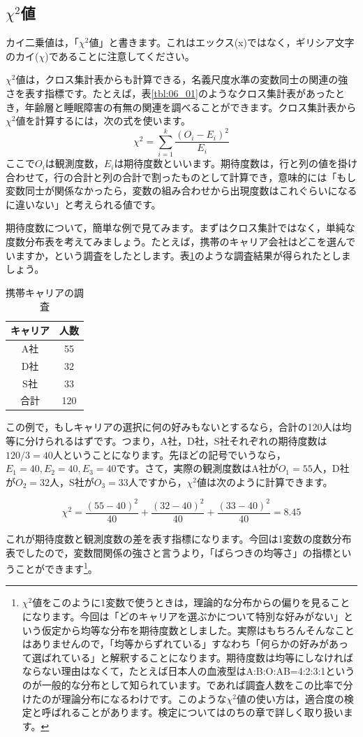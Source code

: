 \documentclass{ltjsbook}
\begin{document}
\subsection{$\chi^2$値}
\label{sec:chi_square}
カイ二乗値は，「$\chi^2$値」と書きます。これはエックス(x)ではなく，ギリシア文字のカイ($\chi$)であることに注意してください。

$\chi^2$値は，クロス集計表からも計算できる，名義尺度水準の変数同士の関連の強さを表す指標です。たとえば，表\ref{tbl:06_01}のようなクロス集計表があったとき，年齢層と睡眠障害の有無の関連を調べることができます。クロス集計表から$\chi^2$値を計算するには，次の式を使います。
\[
    \chi^2  = \sum_{i=1}^k \frac{(O_i - E_i)^2}{E_i} 
\]
ここで$O_i$は観測度数，$E_i$は期待度数といいます。期待度数は，行と列の値を掛け合わせて，行の合計と列の合計で割ったものとして計算でき，意味的には「もし変数同士が関係なかったら，変数の組み合わせから出現度数はこれぐらいになるに違いない」と考えられる値です。

期待度数について，簡単な例で見てみます。まずはクロス集計ではなく，単純な度数分布表を考えてみましょう。たとえば，携帯のキャリア会社はどこを選んでいますか，という調査をしたとします。表\ref{tbl:06_06}のような調査結果が得られたとしましょう。
\begin{table}[ht]
  \centering
  \caption{携帯キャリアの調査}
  \begin{tabular}{cc}
    キャリア & 人数 \\\hline
    A社      & 55  \\
    D社      & 32  \\
    S社      & 33    \\\hline
    合計      &  120 \\
  \end{tabular}
  \label{tbl:06_06}
\end{table}

この例で，もしキャリアの選択に何の好みもないとするなら，合計の120人は均等に分けられるはずです。つまり，A社，D社，S社それぞれの期待度数は$120/3=40$人ということになります。先ほどの記号でいうなら，$E_1=40, E_2=40, E_3=40$です。さて，実際の観測度数はA社が$O_1=55$人，D社が$O_2=32$人，S社が$O_3=33$人ですから，$\chi^2$値は次のように計算できます。

\[
    \chi^2 = \frac{(55 - 40)^2}{40} + \frac{(32 - 40)^2}{40} + \frac{(33 - 40)^2}{40} = 8.45
\]

これが期待度数と観測度数の差を表す指標になります。今回は1変数の度数分布表でしたので，変数間関係の強さと言うより，「ばらつきの均等さ」の指標ということができます\footnote{$\chi^2$値をこのように1変数で使うときは，理論的な分布からの偏りを見ることになります。今回は「どのキャリアを選ぶかについて特別な好みがない」という仮定から均等な分布を期待度数としました。実際はもちろんそんなことはありませんので，「均等からずれている」すなわち「何らかの好みがあって選ばれている」と解釈することになります。期待度数は均等にしなければならない理由はなくて，たとえば日本人の血液型はA:B:O:AB=4:2:3:1というのが一般的な分布として知られています。であれば調査人数をこの比率で分けたのが理論分布になるわけです。このような$\chi^2$値の使い方は，適合度の検定と呼ばれることがあります。検定についてはのちの章で詳しく取り扱います。}。
\end{document}
